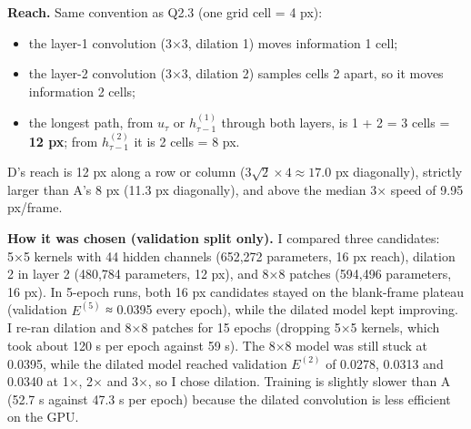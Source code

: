 \documentclass[11pt]{article}
\begin{document}
\textbf{Reach.} Same convention as Q2.3 (one grid cell = 4 px):

\begin{itemize}
\item
  the layer-1 convolution (3×3, dilation 1) moves information 1 cell;
\item
  the layer-2 convolution (3×3, dilation 2) samples cells 2 apart, so it moves information 2 cells;
\item
  the longest path, from \(u_\tau\) or \(h^{(1)}_{\tau-1}\) through both layers, is 1 + 2 = 3 cells = \textbf{12 px}; from \(h^{(2)}_{\tau-1}\) it is 2 cells = 8 px.
\end{itemize}

D's reach is 12 px along a row or column (\(3\sqrt{2} \times 4 \approx 17.0\) px diagonally), strictly larger than A's 8 px (11.3 px diagonally), and above the median 3× speed of 9.95 px/frame.

\textbf{How it was chosen (validation split only).} I compared three candidates: 5×5 kernels with 44 hidden channels (652,272 parameters, 16 px reach), dilation 2 in layer 2 (480,784 parameters, 12 px), and 8×8 patches (594,496 parameters, 16 px). In 5-epoch runs, both 16 px candidates stayed on the blank-frame plateau (validation \(E^{(5)}\) ≈ 0.0395 every epoch), while the dilated model kept improving. I re-ran dilation and 8×8 patches for 15 epochs (dropping 5×5 kernels, which took about 120 s per epoch against 59 s). The 8×8 model was still stuck at 0.0395, while the dilated model reached validation \(E^{(2)}\) of 0.0278, 0.0313 and 0.0340 at 1×, 2× and 3×, so I chose dilation. Training is slightly slower than A (52.7 s against 47.3 s per epoch) because the dilated convolution is less efficient on the GPU.
\end{document}
